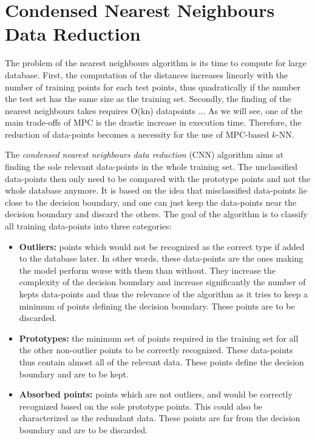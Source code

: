 \section{Condensed Nearest Neighbours Data Reduction}
The problem of the nearest neighbours algorithm is its time to compute for large database. First, the computation of the distances increases linearly with the number of training points for each test points, thus quadratically if the number the test set has the same size as the training set. Secondly, the finding of the nearest neighbours takes requires O(kn) datapoints ... As we will see, one of the main trade-offs of MPC is the drastic increase in execution time. Therefore, the reduction of data-points becomes a necessity for the use of MPC-based $k$-NN.

The \emph{condensed nearest neighbours data reduction} (CNN) algorithm aims at finding the sole relevant data-points in the whole training set. The unclassified data-points then only need to be compared with the prototype points and not the whole database anymore. It is based on the idea that misclassified data-points lie close to the decision boundary, and one can just keep the data-points near the decision boundary and discard the others. The goal of the algorithm is to classify all training data-points into three categories:
\begin{itemize}
    \item \textbf{Outliers:} points which would not be recognized as the correct type if added to the database later. In other words, these data-points are the ones making the model perform worse with them than without. They increase the complexity of the decision boundary and increase significantly the number of kepts data-points and thus the relevance of the algorithm as it tries to keep a minimum of points defining the decision boundary. These points are to be discarded.
    \item \textbf{Prototypes:} the minimum set of points required in the training set for all the other non-outlier points to be correctly recognized. These data-points thus contain almost all of the relevant data. These points define the decision boundary and are to be kept.
    \item \textbf{Absorbed points:} points which are not outliers, and would be correctly recognized based on the sole prototype points. This could also be characterized as the redundant data. These points are far from the decision boundary and are to be discarded.
\end{itemize}

